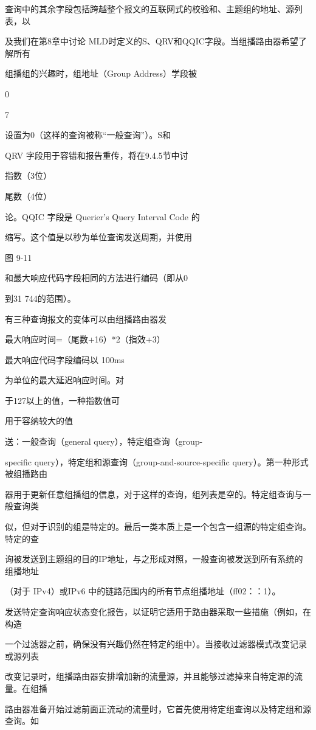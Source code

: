 查询中的其余字段包括跨越整个报文的互联网式的校验和、主题组的地址、源列表，以

及我们在第8章中讨论 MLD时定义的S、QRV和QQIC字段。当组播路由器希望了解所有

组播组的兴趣时，组地址（Group Address）学段被

0

7

设置为0（这样的查询被称“一般查询”）。S和

QRV 字段用于容错和报告重传，将在9.4.5节中讨

指数（3位）

尾数（4位）

论。QQIC 字段是 Querier’s Query Interval Code 的

缩写。这个值是以秒为单位查询发送周期，并使用

图 9-11

和最大响应代码字段相同的方法进行编码（即从0

到31 744的范围）。

有三种查询报文的变体可以由组播路由器发

最大响应时间=（尾数+16）*2（指效+3）

最大响应代码字段编码以 100ms

为单位的最大延迟响应时间。对

于127以上的值，一种指数值可

用于容纳较大的值

送：一般查询（general query），特定组查询（group-

specific query），特定组和源查询（group-and-source-specific query）。第一种形式被组播路由

器用于更新任意组播组的信息，对于这样的查询，组列表是空的。特定组查询与一般查询类

似，但对于识别的组是特定的。最后一类本质上是一个包含一组源的特定组查询。特定的查

询被发送到主题组的目的IP地址，与之形成对照，一般查询被发送到所有系统的组播地址

（对于 IPv4）或IPv6 中的链路范围内的所有节点组播地址（ff02：：1）。

发送特定查询响应状态变化报告，以证明它适用于路由器采取一些措施（例如，在构造

一个过滤器之前，确保没有兴趣仍然在特定的组中）。当接收过滤器模式改变记录或源列表

改变记录时，组播路由器安排增加新的流量源，并且能够过滤掉来自特定源的流量。在组播

路由器准备开始过滤前面正流动的流量时，它首先使用特定组查询以及特定组和源查询。如

